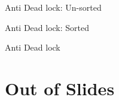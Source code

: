 \documentclass[aspectratio=169,notes]{beamer}
\begin{document}
	\begin{frame}[fragile]{Anti Dead lock: Un-sorted}
		
	\end{frame}

	\begin{frame}[fragile]{Anti Dead lock: Sorted}
		
	\end{frame}

	\begin{frame}[fragile]{Anti Dead lock}
		
		\pause
		
	\end{frame}

	\section{Out of Slides}
\end{document}
